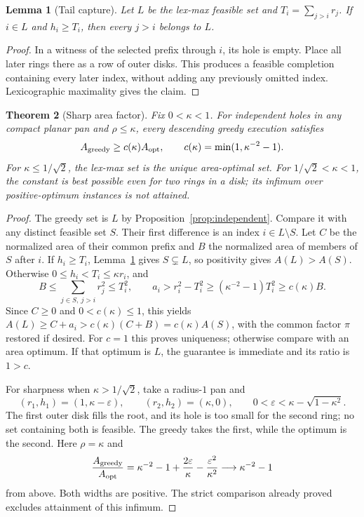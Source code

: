 \documentclass[11pt]{article}
\newtheorem{theorem}{Theorem}
\newtheorem{lemma}[theorem]{Lemma}
\theoremstyle{definition}
\begin{document}
\begin{lemma}[Tail capture]\label{lem:tailcapture}
Let $L$ be the lex-max feasible set and $T_i=\sum_{j>i}r_j$.
If $i\in L$ and $h_i\ge T_i$, then every $j>i$ belongs to $L$.
\end{lemma}
\begin{proof}
In a witness of the selected prefix through $i$, its hole is empty.
Place all later rings there as a row of outer disks. This produces a
feasible completion containing every later index, without adding any
previously omitted index. Lexicographic maximality gives the claim.
\end{proof}

\begin{theorem}[Sharp area factor]\label{thm:variable-area}
Fix $0<\kappa<1$. For independent holes in any compact planar pan
and $\rho\le\kappa$, every descending greedy execution satisfies
\[
 A_{\rm greedy}\ge c(\kappa) A_{\rm opt},\qquad
 c(\kappa)=\min(1,\kappa^{-2}-1).
\]
For $\kappa\le1/\sqrt2$, the lex-max set is the unique area-optimal
set. For $1/\sqrt2<\kappa<1$, the constant is best possible even for
two rings in a disk; its infimum over positive-optimum instances is
not attained.
\end{theorem}
\begin{proof}
The greedy set is $L$ by Proposition~\ref{prop:independent}. Compare
it with any distinct feasible set $S$. Their first difference is an
index $i\in L\setminus S$. Let $C$ be the normalized area of their
common prefix and $B$ the normalized area of members of $S$ after $i$.
If $h_i\ge T_i$, Lemma~\ref{lem:tailcapture} gives $S\subsetneq L$,
so positivity gives $A(L)>A(S)$. Otherwise
$0\le h_i<T_i\le\kappa r_i$, and
\[
 B\le\sum_{j\in S,\ j>i}r_j^2\le T_i^2,\qquad
 a_i>r_i^2-T_i^2\ge(\kappa^{-2}-1)T_i^2\ge c(\kappa)B.
\]
Since $C\ge0$ and $0<c(\kappa)\le1$, this yields
$A(L)\ge C+a_i>c(\kappa)(C+B)=c(\kappa)A(S)$, with the common
factor $\pi$ restored if desired. For $c=1$ this proves uniqueness;
otherwise compare with an area optimum. If that optimum is $L$, the
guarantee is immediate and its ratio is $1>c$.

For sharpness when $\kappa>1/\sqrt2$, take a radius-$1$ pan and
\[
 (r_1,h_1)=(1,\kappa-\varepsilon),\qquad
 (r_2,h_2)=(\kappa,0),\qquad
 0<\varepsilon<\kappa-\sqrt{1-\kappa^2}.
\]
The first outer disk fills the root, and its hole is too small for the
second ring; no set containing both is feasible. The greedy takes the
first, while the optimum is the second. Here $\rho=\kappa$ and
\[
 \frac{A_{\rm greedy}}{A_{\rm opt}}
 =\kappa^{-2}-1+\frac{2\varepsilon}{\kappa}
                  -\frac{\varepsilon^2}{\kappa^2}
 \longrightarrow\kappa^{-2}-1
\]
from above. Both widths are positive. The strict comparison already
proved excludes attainment of this infimum.
\end{proof}
\end{document}
